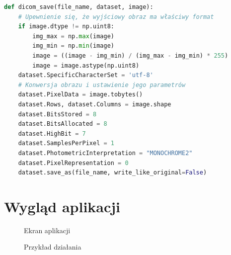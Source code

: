 \documentclass[a4paper]{article}
\begin{document}
\begin{lstlisting}[language=Python, caption=Zapis pliku DICOM, texcl=true]
def dicom_save(file_name, dataset, image):
    # Upewnienie się, że wyjściowy obraz ma właściwy format
    if image.dtype != np.uint8:
        img_max = np.max(image)
        img_min = np.min(image)
        image = ((image - img_min) / (img_max - img_min) * 255)
        image = image.astype(np.uint8)
    dataset.SpecificCharacterSet = 'utf-8'
    # Konwersja obrazu i ustawienie jego parametrów
    dataset.PixelData = image.tobytes()
    dataset.Rows, dataset.Columns = image.shape
    dataset.BitsStored = 8
    dataset.BitsAllocated = 8
    dataset.HighBit = 7
    dataset.SamplesPerPixel = 1
    dataset.PhotometricInterpretation = "MONOCHROME2"
    dataset.PixelRepresentation = 0
    dataset.save_as(file_name, write_like_original=False)
    \end{lstlisting}
\section{Wygląd aplikacji}
\begin{figure}[H]
\caption{Ekran aplikacji}
\end{figure}
\begin{figure}[H]
\caption{Przykład działania}
\end{figure}
\end{document}
